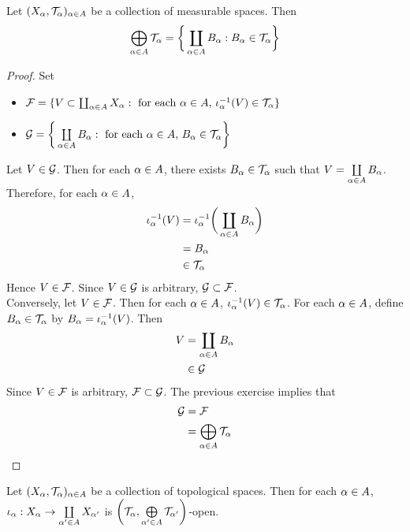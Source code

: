 \documentclass{book}
\begin{document}
	\begin{ex} 
		Let $(X_{\alpha}, \mathcal{T}_{\alpha})_{\alpha \in A}$ be a collection of measurable spaces. Then 
		$$\bigoplus\limits_{\alpha \in A} \mathcal{T}_{\alpha} = \bigg \{\coprod_{\alpha \in A} B_{\alpha}: B_{\alpha} \in \mathcal{T}_{\alpha} \bigg\} $$
	\end{ex}
	
	\begin{proof}
		Set  
		\begin{itemize}
			\item $\mathcal{F}= \{V \subset \coprod_{\alpha \in A}  X_{\alpha}: \text{ for each $\alpha \in A$, $\iota_{\alpha}^{-1}(V) \in \mathcal{T}_{\alpha}$}\}$ 
			\item $\mathcal{G} = \bigg \{  \coprod\limits_{\alpha \in A}  B_{\alpha}: \text{ for each $\alpha \in A$, } B_{\alpha} \in \mathcal{T}_{\alpha} \bigg\}$
		\end{itemize}
		Let $V \in \mathcal{G}$. Then for each $\alpha \in A$, there exists $B_{\alpha} \in \mathcal{T}_{\alpha}$ such that $V =  \coprod\limits_{\alpha \in A}  B_{\alpha}$. Therefore, for each $\alpha \in A$, 
		\begin{align*}
			\iota_{\alpha}^{-1}(V)
			& = \iota_{\alpha}^{-1} \bigg( \coprod\limits_{\alpha \in A}  B_{\alpha} \bigg) \\
			& = B_{\alpha} \\
			& \in \mathcal{T}_{\alpha}
		\end{align*}
		Hence $V \in \mathcal{F}$. Since $V \in \mathcal{G}$ is arbitrary, $\mathcal{G} \subset \mathcal{F}$. \\
		Conversely, let $V \in \mathcal{F}$. Then for each $\alpha \in A$, $\iota_{\alpha}^{-1}(V) \in \mathcal{T}_{\alpha}$. For each $\alpha \in A$, define $B_{\alpha} \in \mathcal{T}_{\alpha}$ by $B_{\alpha} = \iota_{\alpha}^{-1}(V)$. Then 
		\begin{align*}
			V 
			& = \coprod\limits_{\alpha \in A} B_{\alpha} \\
			& \in \mathcal{G} 
		\end{align*}
		Since $V \in \mathcal{F}$ is arbitrary, $\mathcal{F} \subset \mathcal{G}$. The previous exercise implies that 
		\begin{align*}
			\mathcal{G}
			& = \mathcal{F} \\
			& = \bigoplus\limits_{\alpha \in A} \mathcal{T}_{\alpha}
		\end{align*}
	\end{proof}

	\begin{ex} 
		Let $(X_{\alpha}, \mathcal{T}_{\alpha})_{\alpha \in A}$ be a collection of topological spaces. Then for each $\alpha \in A$, $\iota_{\alpha}: X_{\alpha} \rightarrow \coprod\limits_{\alpha' \in A} X_{\alpha'}$ is $\bigg(\mathcal{T}_{\alpha}, \bigoplus\limits_{\alpha' \in A} \mathcal{T}_{\alpha'} \bigg)$-open.
	\end{ex}
\end{document}
